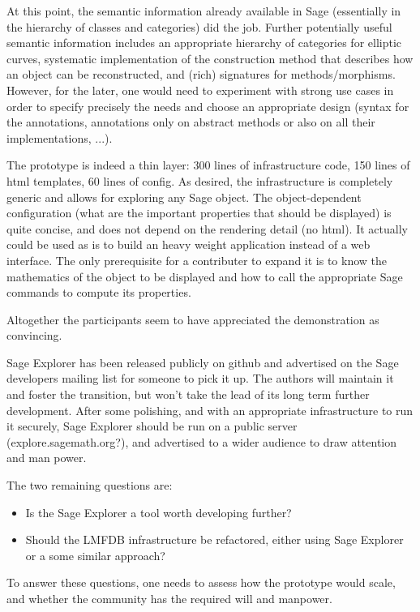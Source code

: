 \documentclass{article}
\begin{document}
At this point, the semantic information already available in Sage
(essentially in the hierarchy of classes and categories) did the
job. Further potentially useful semantic information includes an
appropriate hierarchy of categories for elliptic curves, systematic
implementation of the construction method that describes how an object
can be reconstructed, and (rich) signatures for
methods/morphisms. However, for the later, one would need to
experiment with strong use cases in order to specify precisely the
needs and choose an appropriate design (syntax for the annotations,
annotations only on abstract methods or also on all their
implementations, ...).

The prototype is indeed a thin layer: 300 lines of infrastructure
code, 150 lines of html templates, 60 lines of config. As desired, the
infrastructure is completely generic and allows for exploring any Sage
object. The object-dependent configuration (what are the important
properties that should be displayed) is quite concise, and does not
depend on the rendering detail (no html). It actually could be used as
is to build an heavy weight application instead of a web interface.
The only prerequisite for a contributer to expand it is to know the
mathematics of the object to be displayed and how to call the
appropriate Sage commands to compute its properties.



Altogether the participants seem to have appreciated the demonstration
as convincing.

Sage Explorer has been released publicly on github and advertised on
the Sage developers mailing list for someone to pick it up. The
authors will maintain it and foster the transition, but won't take the
lead of its long term further development. After some polishing, and
with an appropriate infrastructure to run it securely, Sage Explorer
should be run on a public server (explore.sagemath.org?), and
advertised to a wider audience to draw attention and man power.

The two remaining questions are: 
\begin{itemize}
\item Is the Sage Explorer a tool worth developing further?
\item Should the LMFDB infrastructure be refactored, either using Sage
  Explorer or a some similar approach?
\end{itemize}

To answer these questions, one needs to assess how the prototype would
scale, and whether the community has the required will and manpower.
\end{document}
